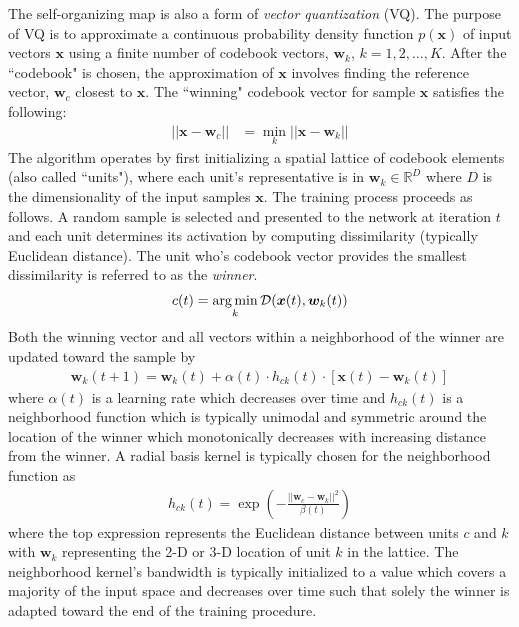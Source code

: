 The self-organizing map is also a form of \textit{vector quantization} (VQ).  The purpose of VQ is to approximate a continuous probability density function $p(\bm{x})$ of input vectors $\bm{x}$ using a finite number of codebook vectors, $\bm{w}_{k}$, $k=1,2,\dots,K$.  After the ``codebook" is chosen, the approximation of $\bm{x}$ involves finding the reference vector, $\bm{w}_{c}$ closest to $\bm{x}$.  The ``winning" codebook vector for sample $\bm{x}$ satisfies the following:
\begin{align}
	|| \bm{x} - \bm{w}_c|| &= \min_{k}|| \bm{x} - \bm{w}_{k} ||
\end{align}	
\noindent
The algorithm operates by first initializing a spatial lattice of codebook elements (also called ``units"), where each unit's representative is in $\bm{w}_{k} \in \mathbb{R}^{D}$ where $D$ is the dimensionality of the input samples $\bm{x}$.  The training process proceeds as follows.  A random sample is selected and presented to the network at iteration $t$ and each unit determines its activation by computing dissimilarity (typically Euclidean distance).	 The unit who's codebook vector provides the smallest dissimilarity is referred to as the \textit{winner}.
\begin{align}
	c(t) = \operatorname*{arg\,min}_{k} \mathcal{D}(\bm{x}(t),\bm{w}_{k}(t))
\end{align}
\noindent
Both the winning vector and all vectors within a neighborhood of the winner are updated toward the sample by 
\begin{align}
	\bm{w}_{k}(t+1) = \bm{w}_{k}(t) + \alpha(t) \cdot h_{ck}(t) \cdot [ \bm{x}(t) - \bm{w}_{k}(t) ] 
\end{align}
\noindent
where $\alpha(t)$ is a learning rate which decreases over time and $h_{ck}(t)$ is a neighborhood function which is typically unimodal and symmetric around the location of the winner which monotonically decreases with increasing distance from the winner.  A radial basis kernel is typically chosen for the neighborhood function as 
\begin{align}
	h_{ck}(t) = \exp{\left( -\frac{||\bm{w}_{c} - \bm{w}_{k} ||^{2}}{\beta(t)} \right)}
\end{align}
\noindent
where the top expression represents the Euclidean distance between units $c$ and $k$ with $\bm{w}_{k}$ representing the 2-D or 3-D location of unit $k$ in the lattice.  The neighborhood kernel's bandwidth is typically initialized to a value which covers a majority of the input space and decreases over time such that solely the winner is adapted toward the end of the training procedure. \\

